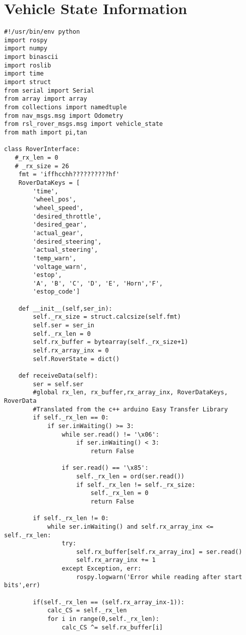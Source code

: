 \section*{Vehicle State Information}
\begin{lstlisting}[breaklines=true,basicstyle=\tiny]
#!/usr/bin/env python
import rospy
import numpy
import binascii
import roslib
import time
import struct
from serial import Serial
from array import array
from collections import namedtuple
from nav_msgs.msg import Odometry
from rsl_rover_msgs.msg import vehicle_state
from math import pi,tan

class RoverInterface: 
   #_rx_len = 0
   # _rx_size = 26
    fmt = 'iffhcchh??????????hf'
    RoverDataKeys = [
        'time',
        'wheel_pos',
        'wheel_speed',
        'desired_throttle',
        'desired_gear',
        'actual_gear',
        'desired_steering',
        'actual_steering',
        'temp_warn',
        'voltage_warn',
        'estop',
        'A', 'B', 'C', 'D', 'E', 'Horn','F',
        'estop_code']

    def __init__(self,ser_in):
        self._rx_size = struct.calcsize(self.fmt)
        self.ser = ser_in
        self._rx_len = 0
        self.rx_buffer = bytearray(self._rx_size+1)
        self.rx_array_inx = 0
        self.RoverState = dict()

    def receiveData(self):
        ser = self.ser
        #global rx_len, rx_buffer,rx_array_inx, RoverDataKeys, RoverData
        #Translated from the c++ arduino Easy Transfer Library
        if self._rx_len == 0:
            if ser.inWaiting() >= 3:
                while ser.read() != '\x06':
                    if ser.inWaiting() < 3:
                        return False

                if ser.read() == '\x85':
                    self._rx_len = ord(ser.read())
                    if self._rx_len != self._rx_size:
                        self._rx_len = 0
                        return False
        
        if self._rx_len != 0:
            while ser.inWaiting() and self.rx_array_inx <= self._rx_len:
                try:
                    self.rx_buffer[self.rx_array_inx] = ser.read()
                    self.rx_array_inx += 1
                except Exception, err:
                    rospy.logwarn('Error while reading after start bits',err)

        if(self._rx_len == (self.rx_array_inx-1)):
            calc_CS = self._rx_len
            for i in range(0,self._rx_len):
                calc_CS ^= self.rx_buffer[i]


\end{lstlisting}
